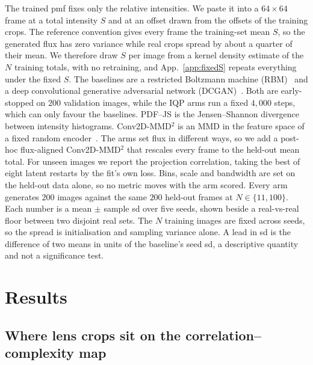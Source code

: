 \documentclass{article}
\begin{document}
The trained pmf fixes only the relative intensities. We paste it into a $64\times64$ frame at a
total intensity $S$ and at an offset drawn from the offsets of the training crops. The reference
convention gives every frame the training-set mean $S$, so the generated flux has zero variance
while real crops spread by about a quarter of their mean. We therefore draw $S$ per image from a
kernel density estimate of the $N$ training totals, with no retraining, and App.~\ref{app:fixedS}
repeats everything under the fixed $S$. The baselines are a restricted Boltzmann machine
(RBM)~\cite{smolensky_1986_information,hinton_2002_training,tieleman_2008_training} and a deep
convolutional generative adversarial network (DCGAN)~\cite{radford_2015_unsupervised}. Both are
early-stopped on $200$ validation images, while the IQP arms run a fixed $4{,}000$ steps, which can
only favour the baselines. PDF--JS is the Jensen--Shannon divergence between intensity histograms.
Conv2D-MMD$^2$ is an MMD in the feature space of a fixed random
encoder~\cite{gretton_2012_kernel,binkowski_2018_demystifying}. The arms set flux in different
ways, so we add a post-hoc flux-aligned Conv2D-MMD$^2$ that rescales every frame to the held-out
mean total. For unseen images we report the projection correlation, taking the best of eight latent
restarts by the fit's own loss. Bins, scale and bandwidth are set on the held-out data alone, so no
metric moves with the arm scored. Every arm generates $200$ images against the same $200$ held-out
frames at $N \in \{11,100\}$. Each number is a mean $\pm$ sample sd over five seeds, shown beside a
real-vs-real floor between two disjoint real sets. The $N$ training images are fixed across seeds,
so the spread is initialisation and sampling variance alone. A lead in sd is the difference of two
means in units of the baseline's seed sd, a descriptive quantity and not a significance test.

\section{Results}
\label{sec:results}

\subsection{Where lens crops sit on the correlation--complexity map}
\label{sec:map}
\end{document}
